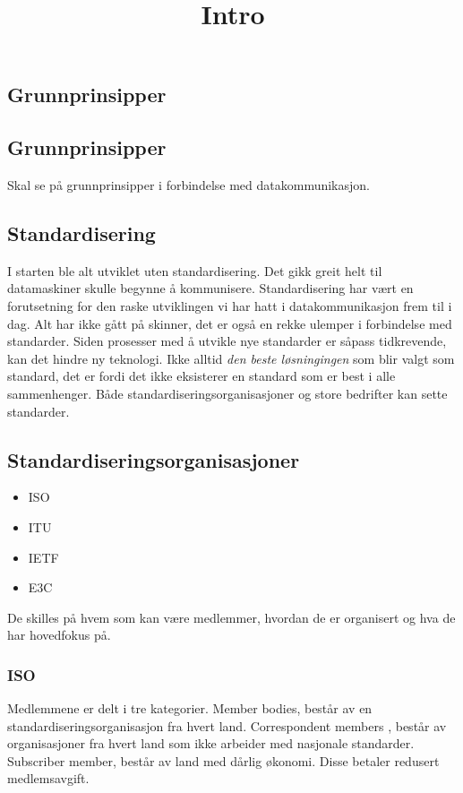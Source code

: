 \documentclass{article}
\title{Intro}
\begin{document}
    \begin{flushleft}
        \section{Grunnprinsipper}

        \subsection{Grunnprinsipper}
        Skal se på grunnprinsipper i forbindelse med datakommunikasjon.

        \subsection{Standardisering }
        I starten ble alt utviklet uten standardisering. Det gikk greit helt til datamaskiner skulle begynne å kommunisere. 
        Standardisering har vært en forutsetning for den raske utviklingen vi har hatt i datakommunikasjon frem til i dag.
        Alt har ikke gått på skinner, det er også en rekke ulemper i forbindelse med standarder. 
        Siden prosesser med å utvikle nye standarder er såpass tidkrevende, kan det hindre ny teknologi. 
        Ikke alltid \emph{den beste løsningingen} som blir valgt som standard, det er fordi det ikke eksisterer en standard som er best i alle sammenhenger.
        Både standardiseringsorganisasjoner og store bedrifter kan sette standarder.

        \subsection{Standardiseringsorganisasjoner}
        \begin{itemize}
            \item ISO
            \item ITU
            \item IETF
            \item E3C
        \end{itemize}
        De skilles på hvem som kan være medlemmer, hvordan de er organisert og hva de har hovedfokus på. 

        \subsubsection{ISO}
        Medlemmene er delt i tre kategorier. Member bodies, består av en standardiseringsorganisasjon fra hvert land. 
        Correspondent members , består av organisasjoner fra hvert land som ikke arbeider med nasjonale standarder.
        Subscriber member, består av land med dårlig økonomi. Disse betaler redusert medlemsavgift. 


\end{flushleft}
\end{document}
